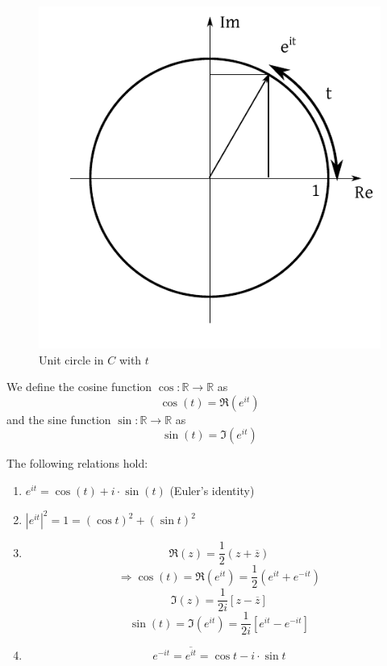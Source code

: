 \documentclass[a4paper,landscape,twocolumn]{article}
\theoremstyle{definition}
\newcommand\abs[1]{\left|#1\right|}
\begin{document}
\begin{figure}[!h]
  \begin{center}
    \includegraphics{img/unitcircle_in_C.pdf}
    \caption{Unit circle in $C$ with $t$}
    \label{img:unitc}
  \end{center}
\end{figure}

We define the cosine function $\cos: \mathbb R \to \mathbb R$ as
\[ \cos(t) = \Re(e^{it}) \]
and the sine function $\sin: \mathbb R \to \mathbb R$ as
\[ \sin(t) = \Im(e^{it}) \]

The following relations hold:
\begin{enumerate}
  \item $e^{it} = \cos(t) + i \cdot \sin(t)$ (Euler's identity)
  \item $\abs{e^{it}}^2 = 1 = (\cos{t})^2 + (\sin{t})^2$
  \item \[ \Re(z) = \frac12 (z + \overline{z}) \]
    \[ \Rightarrow \cos(t) = \Re(e^{it}) = \frac12 \left(e^{it} + e^{-it}\right) \]
    \[ \Im(z) = \frac1{2i} [z - \overline{z}] \]
    \[ \sin(t) = \Im(e^{it}) = \frac{1}{2i} \left[e^{it} - e^{-it}\right] \]
  \item
    \[ e^{-it} = \overline{e^{it}} = \cos{t} - i \cdot \sin{t} \]
\end{enumerate}
\end{document}
